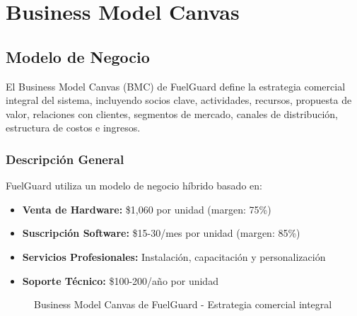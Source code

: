 \documentclass[12pt,a4paper,oneside]{report}
\begin{document}
\chapter{Business Model Canvas}

\section{Modelo de Negocio}

El Business Model Canvas (BMC) de FuelGuard define la estrategia comercial integral del sistema, incluyendo socios clave, actividades, recursos, propuesta de valor, relaciones con clientes, segmentos de mercado, canales de distribución, estructura de costos e ingresos.

\subsection{Descripción General}

FuelGuard utiliza un modelo de negocio híbrido basado en:

\begin{itemize}
    \item \textbf{Venta de Hardware:} \$1,060 por unidad (margen: 75\%)
    \item \textbf{Suscripción Software:} \$15-30/mes por unidad (margen: 85\%)
    \item \textbf{Servicios Profesionales:} Instalación, capacitación y personalización
    \item \textbf{Soporte Técnico:} \$100-200/año por unidad
\end{itemize}

\begin{figure}[H]
    \centering
    \caption{Business Model Canvas de FuelGuard - Estrategia comercial integral}
\end{figure}
\end{document}
